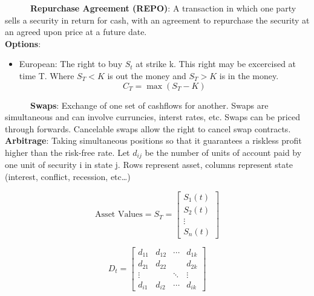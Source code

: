 \documentclass[
  twocolumn]{article}
\providecommand{\tightlist}{%
  \setlength{\itemsep}{0pt}\setlength{\parskip}{0pt}}
\begin{document}
~~~~~~\textbf{Repurchase Agreement (REPO)}: A transaction in which one
party sells a security in return for cash, with an agreement to
repurchase the security at an agreed upon price at a future date.\\
\hspace*{0.333em}\hspace*{0.333em}\hspace*{0.333em}\hspace*{0.333em}\hspace*{0.333em}\hspace*{0.333em}\textbf{Options}:
\n

\begin{itemize}
\tightlist
\item
  European: The right to buy \(S_t\) at strike k. This right may be
  excercised at time T. Where \(S_T <K\) is out the money and
  \(S_T > K\) is in the money. \[C_T = \max(S_T -K)\]
\end{itemize}

~~~~~~\textbf{Swaps}: Exchange of one set of cashflows for another.
Swaps are simultaneous and can involve curruncies, interst rates, etc.
Swaps can be priced through forwards. Cancelable swaps allow the right
to cancel swap contracts.\\
\hspace*{0.333em}\hspace*{0.333em}\hspace*{0.333em}\hspace*{0.333em}\hspace*{0.333em}\hspace*{0.333em}\textbf{Arbitrage}:
Taking simultaneous positions so that it guarantees a riskless profit
higher than the risk-free rate. Let \(d_{ij}\) be the number of units of
account paid by one unit of security i in state j. Rows represent asset,
columns represent state (interest, conflict, recession, etc\ldots)

\[
\text{Asset Values} = S_T = 
\begin{bmatrix} 
S_1(t) \\
S_2(t) \\
\vdots \\
S_n(t)
\end{bmatrix}
\]

\[
D_t = \begin{bmatrix}
d_{11} & d_{12} & \cdots & d_{1k} \\
d_{21} & d_{22} & & d_{2k} \\
\vdots & & \ddots & \vdots\\
d_{i1} & d_{i2} & \cdots & d_{ik}
\end{bmatrix}
\]
\end{document}
